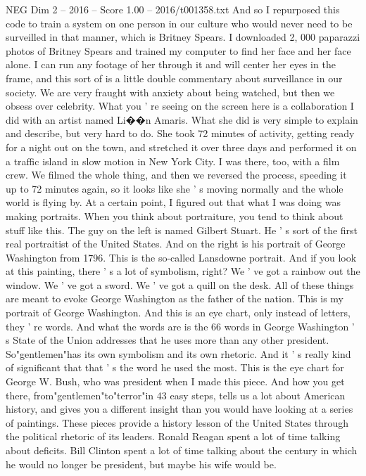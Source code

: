 \begin{textsample}{NEG Dim 2 – 2016 – Score 1.00 – 2016/t001358.txt}
And so I repurposed this code to train a system on one person in our culture who would never need to be surveilled in that manner, which is Britney Spears.
I downloaded 2, 000 paparazzi photos of Britney Spears and trained my computer to find her face and her face alone.
I can run any footage of her through it and will center her eyes in the frame, and this sort of is a little double commentary about surveillance in our society.
We are very fraught with anxiety about being watched, but then we obsess over celebrity.
What you ' re seeing on the screen here is a collaboration I did with an artist named Li{\EmojiFont �}{\EmojiFont �}n Amaris.
What she did is very simple to explain and describe, but very hard to do.
She took 72 minutes of activity, getting ready for a night out on the town, and stretched it over three days and performed it on a traffic island in slow motion in New York City.
I was there, too, with a film crew.
We filmed the whole thing, and then we reversed the process, speeding it up to 72 minutes again, so it looks like she ' s moving normally and the whole world is flying by.
At a certain point, I figured out that what I was doing was making portraits.
When you think about portraiture, you tend to think about stuff like this.
The guy on the left is named Gilbert Stuart.
He ' s sort of the first real portraitist of the United States.
And on the right is his portrait of George Washington from 1796.
This is the so-called Lansdowne portrait.
And if you look at this painting, there ' s a lot of symbolism, right?
We ' ve got a rainbow out the window.
We ' ve got a sword.
We ' ve got a quill on the desk.
All of these things are meant to evoke George Washington as the father of the nation.
This is my portrait of George Washington.
And this is an eye chart, only instead of letters, they ' re words.
And what the words are is the 66 words in George Washington ' s State of the Union addresses that he uses more than any other president.
So"gentlemen"has its own symbolism and its own rhetoric.
And it ' s really kind of significant that that ' s the word he used the most.
This is the eye chart for George W.
Bush, who was president when I made this piece.
And how you get there, from"gentlemen"to"terror"in 43 easy steps, tells us a lot about American history, and gives you a different insight than you would have looking at a series of paintings.
These pieces provide a history lesson of the United States through the political rhetoric of its leaders.
Ronald Reagan spent a lot of time talking about deficits.
Bill Clinton spent a lot of time talking about the century in which he would no longer be president, but maybe his wife would be.

\end{textsample}
